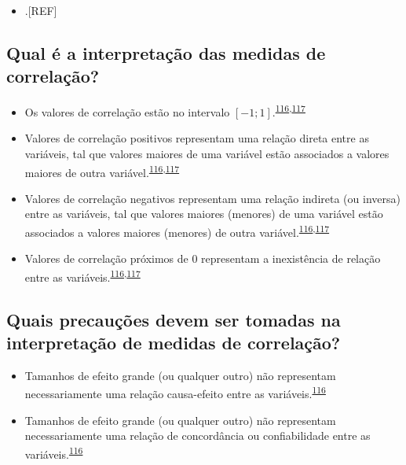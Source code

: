 \documentclass[
]{book}
\providecommand{\tightlist}{%
  \setlength{\itemsep}{0pt}\setlength{\parskip}{0pt}}
\begin{document}
\begin{itemize}
\tightlist
\item
  .{[}REF{]}
\end{itemize}

\hypertarget{qual-uxe9-a-interpretauxe7uxe3o-das-medidas-de-correlauxe7uxe3o}{%
\subsection{Qual é a interpretação das medidas de correlação?}\label{qual-uxe9-a-interpretauxe7uxe3o-das-medidas-de-correlauxe7uxe3o}}

\begin{itemize}
\item
  Os valores de correlação estão no intervalo \([-1; 1]\).\textsuperscript{\protect\hyperlink{ref-khamis2008}{116},\protect\hyperlink{ref-allison2022}{117}}
\item
  Valores de correlação positivos representam uma relação direta entre as variáveis, tal que valores maiores de uma variável estão associados a valores maiores de outra variável.\textsuperscript{\protect\hyperlink{ref-khamis2008}{116},\protect\hyperlink{ref-allison2022}{117}}
\item
  Valores de correlação negativos representam uma relação indireta (ou inversa) entre as variáveis, tal que valores maiores (menores) de uma variável estão associados a valores maiores (menores) de outra variável.\textsuperscript{\protect\hyperlink{ref-khamis2008}{116},\protect\hyperlink{ref-allison2022}{117}}
\item
  Valores de correlação próximos de \(0\) representam a inexistência de relação entre as variáveis.\textsuperscript{\protect\hyperlink{ref-khamis2008}{116},\protect\hyperlink{ref-allison2022}{117}}
\end{itemize}

\hypertarget{quais-precauuxe7uxf5es-devem-ser-tomadas-na-interpretauxe7uxe3o-de-medidas-de-correlauxe7uxe3o}{%
\subsection{Quais precauções devem ser tomadas na interpretação de medidas de correlação?}\label{quais-precauuxe7uxf5es-devem-ser-tomadas-na-interpretauxe7uxe3o-de-medidas-de-correlauxe7uxe3o}}

\begin{itemize}
\item
  Tamanhos de efeito grande (ou qualquer outro) não representam necessariamente uma relação causa-efeito entre as variáveis.\textsuperscript{\protect\hyperlink{ref-khamis2008}{116}}
\item
  Tamanhos de efeito grande (ou qualquer outro) não representam necessariamente uma relação de concordância ou confiabilidade entre as variáveis.\textsuperscript{\protect\hyperlink{ref-khamis2008}{116}}
\end{itemize}
\end{document}
